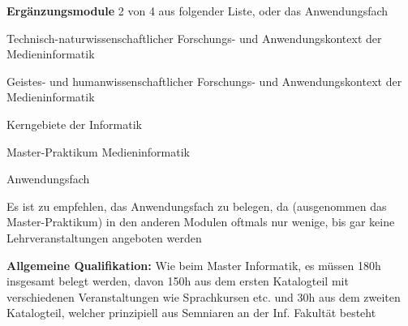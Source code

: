 \documentclass[a4paper,12pt]{report}
\begin{document}
\begin{itemize*}
	\item \textbf{Ergänzungsmodule} 2 von 4  aus folgender Liste, oder das Anwendungsfach
	\begin{itemize*}
		\item Technisch-naturwissenschaftlicher Forschungs- und Anwendungskontext der Medieninformatik
		\item Geistes- und humanwissenschaftlicher Forschungs- und Anwendungskontext der Medieninformatik
		\item Kerngebiete der Informatik
		\item Master-Praktikum Medieninformatik
		\item Anwendungsfach
	\end{itemize*}
	\item Es ist zu empfehlen, das Anwendungsfach zu belegen, da (ausgenommen das Master-Praktikum) in den anderen Modulen oftmals nur wenige, bis gar keine Lehrveranstaltungen angeboten werden
	\item \textbf{Allgemeine Qualifikation:} Wie beim Master Informatik, es müssen 180h insgesamt belegt werden, davon 150h aus dem ersten Katalogteil mit verschiedenen Veranstaltungen wie Sprachkursen etc. und 30h aus dem zweiten Katalogteil, welcher prinzipiell aus Semniaren an der Inf. Fakultät besteht
\end{itemize*}
\end{document}
